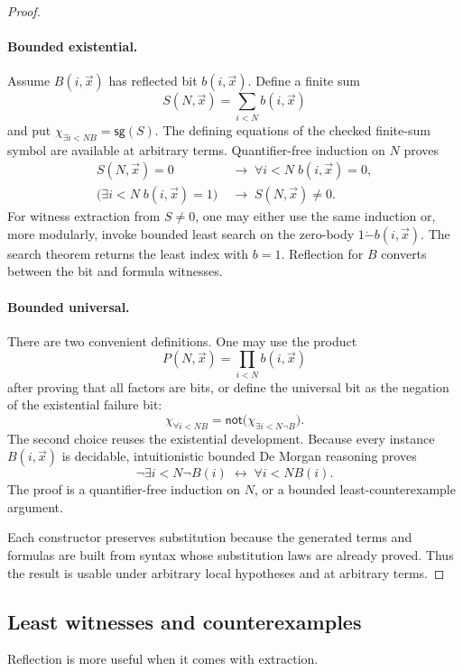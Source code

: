 \begin{proof}
\paragraph{Bounded existential.}
Assume \(B(i,\vec x)\) has reflected bit \(b(i,\vec x)\).  Define a finite sum
\[
  S(N,\vec x)=\sum_{i<N}b(i,\vec x)
\]
and put \(\chi_{\exists i<N B}=\mathsf{sg}(S)\).  The defining equations of the checked finite-sum symbol are available at arbitrary terms.  Quantifier-free induction on \(N\) proves
\begin{align*}
  S(N,\vec x)=0 &\;\to\; \forall i<N\;b(i,\vec x)=0,\\
  \bigl(\exists i<N\;b(i,\vec x)=1\bigr) &\;\to\; S(N,\vec x)\neq 0.
\end{align*}
For witness extraction from \(S\neq 0\), one may either use the same induction or, more modularly, invoke bounded least search on the zero-body \(1\dot{-} b(i,\vec x)\).  The search theorem returns the least index with \(b=1\).  Reflection for \(B\) converts between the bit and formula witnesses.

\paragraph{Bounded universal.}
There are two convenient definitions.  One may use the product
\[
  P(N,\vec x)=\prod_{i<N}b(i,\vec x)
\]
after proving that all factors are bits, or define the universal bit as the negation of the existential failure bit:
\[
  \chi_{\forall i<N B}
  =\mathsf{not}\bigl(\chi_{\exists i<N\neg B}\bigr).
\]
The second choice reuses the existential development.  Because every instance \(B(i,\vec x)\) is decidable, intuitionistic bounded De Morgan reasoning proves
\[
 \neg\exists i<N\neg B(i)\;\leftrightarrow\;\forall i<N B(i).
\]
The proof is a quantifier-free induction on \(N\), or a bounded least-counterexample argument.

Each constructor preserves substitution because the generated terms and formulas are built from syntax whose substitution laws are already proved.  Thus the result is usable under arbitrary local hypotheses and at arbitrary terms.
\end{proof}

\subsection{Least witnesses and counterexamples}

Reflection is more useful when it comes with extraction.

